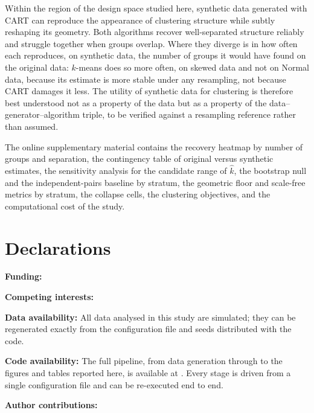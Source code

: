 \documentclass[pdflatex,referee]{sn-jnl}
\begin{document}
Within the region of the design space studied here, synthetic data generated
with CART can reproduce the appearance of clustering structure while subtly
reshaping its geometry. Both algorithms recover well-separated structure
reliably and struggle together when groups overlap. Where they diverge is in
how often each reproduces, on synthetic data, the number of groups it would
have found on the original data: $k$-means does so more often, on skewed data
and not on Normal data, because its estimate is more stable under any
resampling, not because CART damages it less. The utility of synthetic data for
clustering is therefore best understood not as a property of the data but as a
property of the data--generator--algorithm triple, to be verified against a
resampling reference rather than assumed.

\backmatter

The online supplementary material contains the recovery heatmap by number of
groups and separation, the contingency table of original versus synthetic
estimates, the sensitivity analysis for the candidate range of $\hat{k}$, the
bootstrap null and the independent-pairs baseline by stratum, the geometric
floor and scale-free metrics by stratum, the collapse cells, the clustering
objectives, and the computational cost of the study.

\section*{Declarations}

\noindent \textbf{Funding:} 

\noindent \textbf{Competing interests:} 

\noindent \textbf{Data availability:} All data analysed in this study are
  simulated; they can be regenerated exactly from the configuration file and
  seeds distributed with the code.

\noindent \textbf{Code availability:} The full pipeline, from data generation
  through to the figures and tables reported here, is available at
  \repourl{}. Every stage is driven
  from a single configuration file and can be re-executed end to end.

\noindent \textbf{Author contributions:} 


\end{document}
